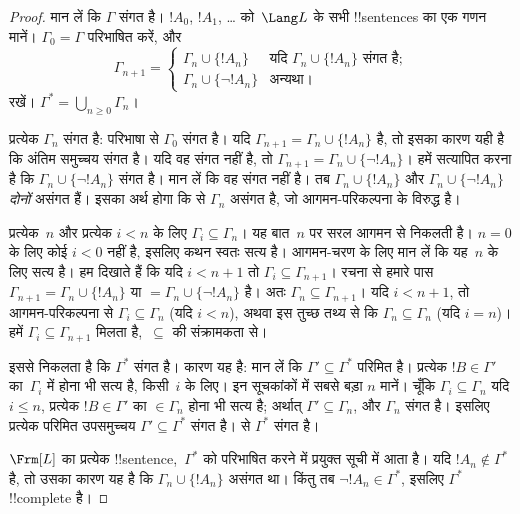 \documentclass[../../../include/open-logic-section]{subfiles}
\begin{document}
\begin{proof}
मान लें कि $\Gamma$ संगत है। $!A_0$, $!A_1$, \dots{} को~$\Lang L$ के सभी
!!{sentence}s का एक गणन मानें। $\Gamma_0 = \Gamma$ परिभाषित करें, और
\[
\Gamma_{n+1} =
\begin{cases}
\Gamma_n \cup \{ !A_n \} & \textrm{यदि $\Gamma_n \cup \{!A_n\}$ संगत
  है;} \\
\Gamma_n \cup \{ \lnot !A_n \} & \textrm{अन्यथा।}
\end{cases}
\]
रखें। $\Gamma^* = \bigcup_{n \geq 0} \Gamma_n$।

प्रत्येक $\Gamma_n$ संगत है: परिभाषा से $\Gamma_0$ संगत है। यदि
$\Gamma_{n+1} = \Gamma_n \cup \{!A_n\}$ है, तो इसका कारण यही है कि अंतिम
समुच्चय संगत है। यदि वह संगत नहीं है, तो $\Gamma_{n+1} = \Gamma_n \cup \{\lnot
!A_n\}$। हमें सत्यापित करना है कि $\Gamma_n \cup \{\lnot !A_n\}$ संगत है।
मान लें कि वह संगत नहीं है। तब $\Gamma_n \cup
\{!A_n\}$ और $\Gamma_n \cup \{\lnot !A_n\}$ \emph{दोनों} असंगत हैं। इसका
अर्थ होगा कि
 से $\Gamma_n$ असंगत
है, जो आगमन-परिकल्पना के विरुद्ध है।

प्रत्येक~$n$ और प्रत्येक $i < n$ के लिए $\Gamma_i \subseteq \Gamma_n$। यह
बात~$n$ पर सरल आगमन से निकलती है। $n=0$ के लिए कोई $i < 0$ नहीं है, इसलिए
कथन स्वतः सत्य है। आगमन-चरण के लिए मान लें कि यह~$n$ के लिए सत्य है। हम
दिखाते हैं कि यदि $i < n+1$ तो $\Gamma_i \subseteq
\Gamma_{n+1}$। रचना से हमारे पास $\Gamma_{n+1} = \Gamma_n \cup \{!A_n\}$ या $=
\Gamma_n \cup \{\lnot !A_n\}$ है। अतः $\Gamma_n \subseteq
\Gamma_{n+1}$। यदि $i < n+1$, तो आगमन-परिकल्पना से $\Gamma_i \subseteq \Gamma_n$
(यदि $i < n$), अथवा इस तुच्छ तथ्य से कि $\Gamma_n
\subseteq \Gamma_n$ (यदि $i = n$)। हमें $\Gamma_i \subseteq
\Gamma_{n+1}$ मिलता है,~$\subseteq$ की संक्रामकता से।

इससे निकलता है कि $\Gamma^*$ संगत है। कारण यह है: मान लें कि
$\Gamma' \subseteq \Gamma^*$ परिमित है। प्रत्येक $!B \in \Gamma'$
का~$\Gamma_i$ में होना भी सत्य है, किसी~$i$ के लिए। इन सूचकांकों में सबसे
बड़ा $n$ मानें। चूँकि $\Gamma_i \subseteq \Gamma_n$ यदि $i \le n$, प्रत्येक $!B \in \Gamma'$
का $\in \Gamma_n$ होना भी सत्य है; अर्थात् $\Gamma' \subseteq \Gamma_n$, और
$\Gamma_n$ संगत है। इसलिए प्रत्येक परिमित उपसमुच्चय $\Gamma' \subseteq
\Gamma^*$ संगत है।
 से $\Gamma^*$ संगत है।

$\Frm[L]$ का प्रत्येक !!{sentence},~$\Gamma^*$ को परिभाषित करने में प्रयुक्त
सूची में आता है। यदि $!A_n \notin \Gamma^*$ है, तो उसका कारण यह है कि
$\Gamma_n \cup \{!A_n\}$ असंगत था। किंतु तब $\lnot !A_n
\in \Gamma^*$, इसलिए $\Gamma^*$ !!{complete} है।
\end{proof}
\end{document}
